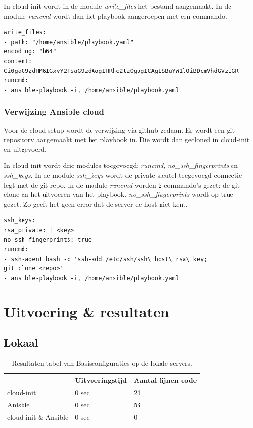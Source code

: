 In cloud-init wordt in de module \textit{write\_files} het bestand aangemaakt. In de module \textit{runcmd} wordt dan het playbook aangeroepen met een commando.
\begin{lstlisting}
write_files:
- path: "/home/ansible/playbook.yaml"
encoding: "b64"
content: Ci0gaG9zdHM6IGxvY2FsaG9zdAogIHRhc2tzOgogICAgLSBuYW1lOiBDcmVhdGVzIGR
runcmd:
- ansible-playbook -i, /home/ansible/playbook.yaml
\end{lstlisting}

\subsubsection{Verwijzing Ansible cloud}
Voor de cloud setup wordt de verwijzing via github gedaan. Er wordt een git repository aangemaakt met het playbook in. Die wordt dan gecloned in cloud-init en uitgevoerd.

In cloud-init wordt drie modules toegevoegd: \textit{runcmd}, \textit{no\_ssh\_fingerprints} en \textit{ssh\_keys}. In de module \textit{ssh\_keys} wordt de private sleutel toegevoegd connectie legt met de git repo. In de module \textit{runcmd} worden 2 commando's gezet: de git clone en het uitvoeren van het playbook. \textit{no\_ssh\_fingerprints} wordt op true gezet. Zo geeft het geen error dat de server de host niet kent.
\begin{lstlisting}
ssh_keys:
rsa_private: | <key>
no_ssh_fingerprints: true
runcmd:
- ssh-agent bash -c 'ssh-add /etc/ssh/ssh\_host\_rsa\_key; 
git clone <repo>'
- ansible-playbook -i, /home/ansible/playbook.yaml
\end{lstlisting}

\section{Uitvoering \& resultaten}

\subsection{Lokaal}

\begin{table}[!htb]
	\centering
	\begin{tabular}{| l | l | l |}
		\hline
		& \textbf{Uitvoeringstijd} & \textbf{Aantal lijnen code}  \\ \hline
		cloud-init & 0 sec & 24 \\ \hline
		Anisble & 0 sec & 53 \\ \hline
		cloud-init \& Ansible & 0 sec & 0 \\
		\hline
	\end{tabular}
	\caption{Resultaten tabel van Basisconfiguraties op de lokale servers.}
	\label{tab:tabel lokale resultaten basis}
\end{table}



